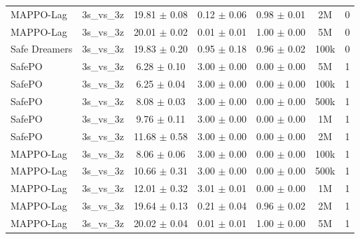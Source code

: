 \documentclass{article}
\begin{document}
\begin{longtable}{lcccccc}
MAPPO-Lag & 3s\_vs\_3z & \textcolor{green!60!black}{19.81 $\pm$ 0.08} & \textcolor{red!70!black}{0.12 $\pm$ 0.06} & \textcolor{red!70!black}{0.98 $\pm$ 0.01} & 2M & 0 \\
MAPPO-Lag & 3s\_vs\_3z & \textcolor{red!70!black}{20.01 $\pm$ 0.02} & \textcolor{red!70!black}{0.01 $\pm$ 0.01} & \textcolor{red!70!black}{1.00 $\pm$ 0.00} & 5M & 0 \\
Safe Dreamers & 3s\_vs\_3z & 19.83 $\pm$ 0.20 & 0.95 $\pm$ 0.18 & 0.96 $\pm$ 0.02 & 100k & 0 \\
\midrule
SafePO & 3s\_vs\_3z & \textcolor{green!60!black}{6.28 $\pm$ 0.10} & \textcolor{green!60!black}{3.00 $\pm$ 0.00} & \textcolor{green!60!black}{0.00 $\pm$ 0.00} & 5M & 1 \\
SafePO & 3s\_vs\_3z & \textcolor{green!60!black}{6.25 $\pm$ 0.04} & \textcolor{green!60!black}{3.00 $\pm$ 0.00} & \textcolor{green!60!black}{0.00 $\pm$ 0.00} & 100k & 1 \\
SafePO & 3s\_vs\_3z & \textcolor{green!60!black}{8.08 $\pm$ 0.03} & \textcolor{green!60!black}{3.00 $\pm$ 0.00} & \textcolor{green!60!black}{0.00 $\pm$ 0.00} & 500k & 1 \\
SafePO & 3s\_vs\_3z & \textcolor{green!60!black}{9.76 $\pm$ 0.11} & \textcolor{green!60!black}{3.00 $\pm$ 0.00} & \textcolor{green!60!black}{0.00 $\pm$ 0.00} & 1M & 1 \\
SafePO & 3s\_vs\_3z & \textcolor{green!60!black}{11.68 $\pm$ 0.58} & \textcolor{green!60!black}{3.00 $\pm$ 0.00} & \textcolor{green!60!black}{0.00 $\pm$ 0.00} & 2M & 1 \\
MAPPO-Lag & 3s\_vs\_3z & \textcolor{green!60!black}{8.06 $\pm$ 0.06} & \textcolor{green!60!black}{3.00 $\pm$ 0.00} & \textcolor{green!60!black}{0.00 $\pm$ 0.00} & 100k & 1 \\
MAPPO-Lag & 3s\_vs\_3z & \textcolor{green!60!black}{10.66 $\pm$ 0.31} & \textcolor{green!60!black}{3.00 $\pm$ 0.00} & \textcolor{green!60!black}{0.00 $\pm$ 0.00} & 500k & 1 \\
MAPPO-Lag & 3s\_vs\_3z & \textcolor{green!60!black}{12.01 $\pm$ 0.32} & \textcolor{green!60!black}{3.01 $\pm$ 0.01} & \textcolor{green!60!black}{0.00 $\pm$ 0.00} & 1M & 1 \\
MAPPO-Lag & 3s\_vs\_3z & \textcolor{green!60!black}{19.64 $\pm$ 0.13} & \textcolor{red!70!black}{0.21 $\pm$ 0.04} & \textcolor{green!60!black}{0.96 $\pm$ 0.02} & 2M & 1 \\
MAPPO-Lag & 3s\_vs\_3z & \textcolor{red!70!black}{20.02 $\pm$ 0.04} & \textcolor{red!70!black}{0.01 $\pm$ 0.01} & \textcolor{red!70!black}{1.00 $\pm$ 0.00} & 5M & 1 \\

\end{longtable}
\end{document}
